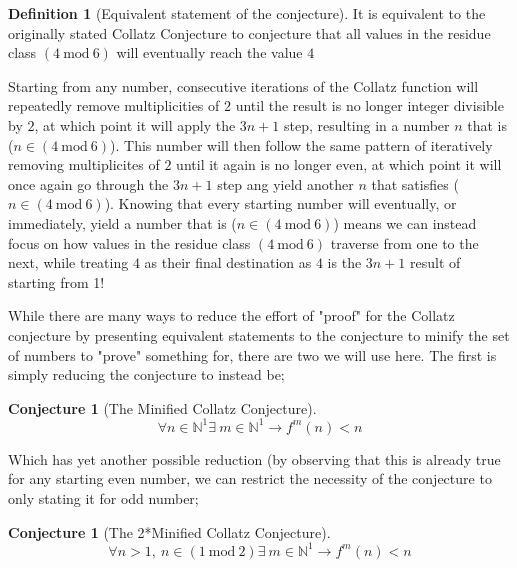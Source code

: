 \documentclass[12pt,a4paper]{amsart}
\numberwithin{equation}{section}
\theoremstyle{plain}
\theoremstyle{definition}
\newtheorem{Def}[Th]{Definition}
\newtheorem{Conj}[Th]{Conjecture}
\begin{document}
\begin{Def}[Equivalent statement of the conjecture]
It is equivalent to the originally stated Collatz Conjecture to conjecture that all values in the residue class $\left ( 4\:\mathrm{mod}\:6 \right )$ will eventually reach the value $4$
\end{Def}

Starting from any number, consecutive iterations of the Collatz function will repeatedly remove multiplicities of $2$ until the result is no longer integer divisible by $2$, at which point it will apply the $3n+1$ step, resulting in a number $n$ that is ($n \in \left ( 4\:\mathrm{mod}\:6 \right )$). This number will then follow the same pattern of iteratively removing multiplicites of $2$ until it again is no longer even, at which point it will once again go through the $3n+1$ step ang yield another $n$ that satisfies ($n \in \left ( 4\:\mathrm{mod}\:6 \right )$). Knowing that every starting number will eventually, or immediately, yield a number that is ($n \in \left ( 4\:\mathrm{mod}\:6 \right )$) means we can instead focus on how values in the residue class $\left ( 4\:\mathrm{mod}\:6 \right )$ traverse from one to the next, while treating $4$ as their final destination as $4$ is the $3n+1$ result of starting from 1!

While there are many ways to reduce the effort of "proof" for the Collatz conjecture by presenting equivalent statements to the conjecture to minify the set of numbers to "prove" something for, there are two we will use here. The first is simply reducing the conjecture to instead be;

\begin{Conj}[The Minified Collatz Conjecture]
\begin{equation}
\forall n \in \mathbb{N}^{1} \exists \: m \in \mathbb{N}^{1} \rightarrow f^{m}\left ( n \right )<n
\end{equation}
\end{Conj}

Which has yet another possible reduction (by observing that this is already true for any starting even number, we can restrict the necessity of the conjecture to only stating it for odd number;

\begin{Conj}[The 2*Minified Collatz Conjecture]
\begin{equation}
\forall n>1\mathrm{,}\:n \in \left ( 1\:\mathrm{mod}\:2 \right ) \exists \: m \in \mathbb{N}^{1} \rightarrow f^{m}\left ( n \right )<n
\end{equation}
\end{Conj}
\end{document}
